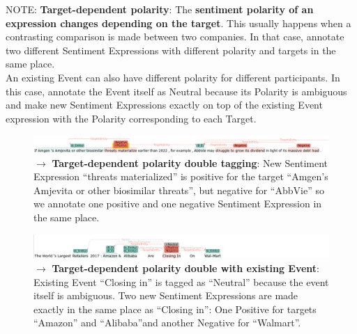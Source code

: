 \newpage
\noindent
\textcolor{BrickRed}{NOTE: \textbf{Target-dependent polarity}: The \textbf{sentiment polarity of an expression changes depending on the target}.
This usually happens when a contrasting comparison is made between two companies.
In that case, annotate two different Sentiment Expressions with different polarity and targets in the same place.\\
An existing Event can also have different polarity for different participants.
In this case, annotate the Event itself as Neutral because its Polarity is ambiguous and make new Sentiment Expressions exactly on top of the existing Event expression with the Polarity corresponding to each Target.}

\begin{figure}[!ht]
    \centering
    \includegraphics[width=\textwidth]{img/abbv07 s31 target dependent new sentiment example.png}
    \caption*{$\rightarrow$ \textbf{Target-dependent polarity double tagging}: New Sentiment Expression ``threats materialized'' is positive for the target ``Amgen's Amjevita or other biosimilar threats'', but negative for ``AbbVie'' so we annotate one positive and one negative Sentiment Expression in the same place.}
\end{figure}

\begin{figure}[!ht]
    \centering
    \includegraphics[width=\textwidth]{img/amz00 s01 target dependent polarity double tagging on event.png}
    \caption*{$\rightarrow$ \textbf{Target-dependent polarity double with existing Event}: Existing Event ``Closing in'' is tagged as ``Neutral'' because the event itself is ambiguous. 
    Two new Sentiment Expressions are made exactly in the same place as ``Closing in'': One Positive for targets ``Amazon'' and ``Alibaba''and another Negative for ``Walmart''.}
\end{figure}


